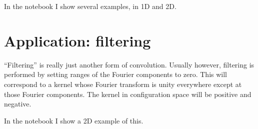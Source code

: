 In the notebook I show several examples, in 1D and 2D. 

\section{Application: filtering}

``Filtering'' is really just another form of convolution. Usually
however, filtering is performed by setting ranges of the Fourier
components to zero. This will correspond to a kernel whose Fourier
transform is unity everywhere except at those Fourier components.  The
kernel in configuration space will be positive and negative.

In the notebook I show a 2D example of this. 
